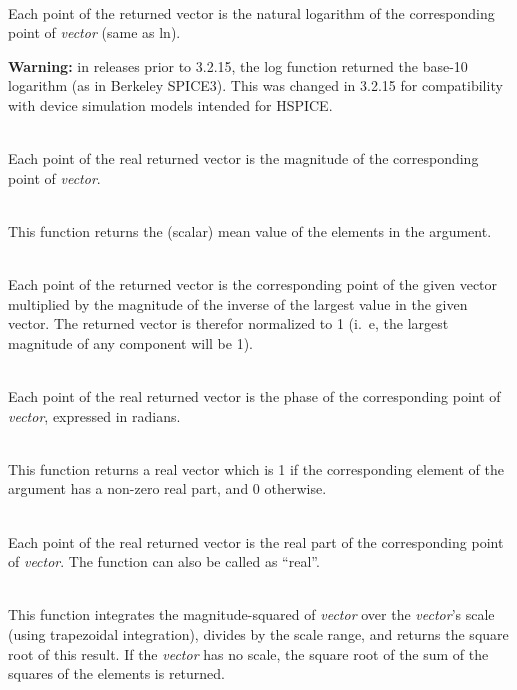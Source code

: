\begin{description}
\item{}\\
Each point of the returned vector is the natural logarithm of the
corresponding point of {\it vector} (same as {\vt ln}).

{\bf Warning:} in releases prior to 3.2.15, the {\vt log} function
returned the base-10 logarithm (as in Berkeley SPICE3).  This was
changed in 3.2.15 for compatibility with device simulation models
intended for HSPICE.

\item{}\\
Each point of the real returned vector is the magnitude of the
corresponding point of {\it vector}.

\item{}\\
This function returns the (scalar) mean value of the elements in
the argument.

\item{}\\
Each point of the returned vector is the corresponding point of the
given vector multiplied by the magnitude of the inverse of the largest
value in the given vector.  The returned vector is therefor normalized
to 1 (i.~e, the largest magnitude of any component will be 1).

\item{}\\
Each point of the real returned vector is the phase of the
corresponding point of {\it vector}, expressed in radians.

\item{}\\
This function returns a real vector which is 1 if the corresponding
element of the argument has a non-zero real part, and 0 otherwise.

\item{}\\
Each point of the real returned vector is the real part of the
corresponding point of {\it vector}.  The function can also be called
as ``{\vt real}''.

\item{}\\
This function integrates the magnitude-squared of {\it vector} over
the {\it vector\/}'s scale (using trapezoidal integration), divides by
the scale range, and returns the square root of this result.  If the
{\it vector} has no scale, the square root of the sum of the squares
of the elements is returned.


\end{description}
